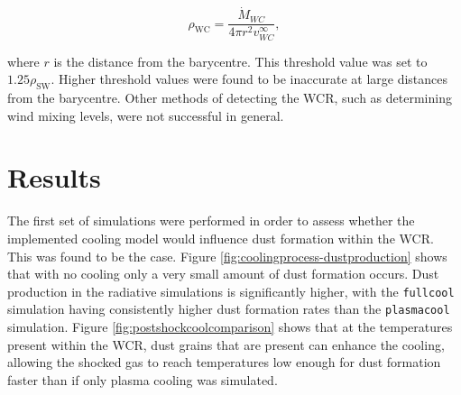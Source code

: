 \begin{equation}
  \rho_\text{WC} = \frac{\dot{M}_{WC}}{4 \pi r^2 v^\infty_{WC}},
\end{equation}

\noindent
where $r$ is the distance from the barycentre.
This threshold value was set to $1.25\rho_\text{SW}$.
Higher threshold values were found to be inaccurate at large distances from the barycentre.
Other methods of detecting the WCR, such as determining wind mixing levels, were not successful in general.


\section{Results}
\label{sec:p1-results}

The first set of simulations were performed in order to assess whether the implemented cooling model would influence dust formation within the WCR.
This was found to be the case.
Figure \ref{fig:coolingprocess-dustproduction} shows that with no cooling only a very small amount of dust formation occurs.
Dust production in the radiative simulations is significantly higher, with the \texttt{fullcool} simulation having consistently higher dust formation rates than the \texttt{plasmacool} simulation.
Figure \ref{fig:postshockcoolcomparison} shows that at the temperatures present within the WCR, dust grains that are present can enhance the cooling, allowing the shocked gas to reach temperatures low enough for dust formation faster than if only plasma cooling was simulated.


